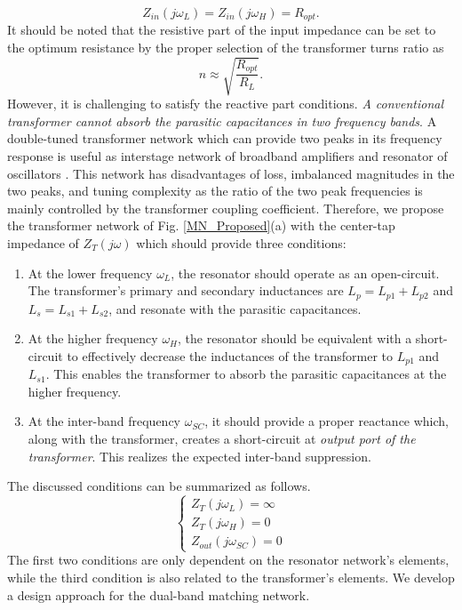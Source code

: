 \documentclass{IEEEtran}
\begin{document}
\begin{equation}
    \label{Zin}
    Z_{in}(j \omega_L) = Z_{in}(j \omega_H) = R_{opt}.
\end{equation}
It should be noted that the resistive part of the input impedance can be set to the optimum resistance by the proper selection of the transformer turns ratio as 
\begin{equation}
    \label{turn_ratio}
    n \approx \sqrt{\frac{R_{opt}}{R_L}}.
\end{equation}
However, it is challenging to satisfy the reactive part conditions. \textit{A conventional transformer cannot absorb the parasitic capacitances in two frequency bands}. A double-tuned transformer network which can provide two peaks in its frequency response is useful as interstage network of broadband amplifiers and resonator of oscillators \cite{vigilante-jssc2018, mazzanti2018second, bevilacqua2020doubly}. This network has disadvantages of loss, imbalanced magnitudes in the two peaks, and tuning complexity as the ratio of the two peak frequencies is mainly controlled by the transformer coupling coefficient. 
Therefore, we propose the transformer network of Fig. \ref{MN_Proposed}(a) with the center-tap impedance of $Z_T(j\omega)$ which should provide three conditions: 
\begin{enumerate}
    \item At the lower frequency $\omega_L$, the resonator should operate as an open-circuit. The transformer's primary and secondary inductances are $L_p = L_{p1} + L_{p2}$ and $L_s = L_{s1} + L_{s2}$, and resonate with the parasitic capacitances.
    \item At the higher frequency $\omega_H$, the resonator should be equivalent with a short-circuit to effectively decrease the inductances of the transformer to $L_{p1}$ and $L_{s1}$. This enables the transformer to absorb the parasitic capacitances at the higher frequency. 
    \item At the inter-band frequency $\omega_{SC}$, it should provide a proper reactance which, along with the transformer, creates a short-circuit at \textit{output port of the transformer}. This realizes the expected inter-band suppression. 
\end{enumerate}

The discussed conditions can be summarized as follows.
\begin{equation}\label{Z_T}
 \begin{cases}
 Z_{T}(j\omega_{L})=\infty \ \\ Z_{T}(j\omega_{H})=0 \ \\ Z_{out}(j\omega_{SC})=0 
 \end{cases}
\end{equation}
The first two conditions are only dependent on the resonator network's elements, while the third condition is also related to the transformer's elements. We develop a design approach for the dual-band matching network. 
\end{document}
